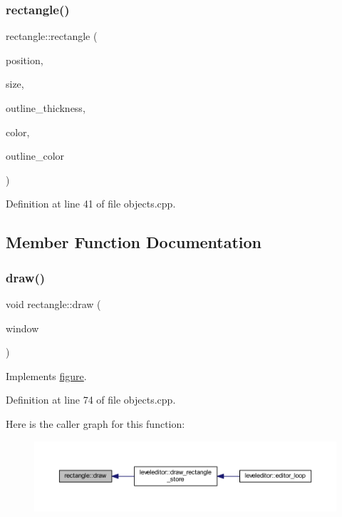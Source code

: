 \subsubsection{\texorpdfstring{rectangle()}{rectangle()}}
{\footnotesize\ttfamily rectangle\+::rectangle (\begin{DoxyParamCaption}\item[{sf\+::\+Vector2f}]{position,  }\item[{sf\+::\+Vector2f}]{size,  }\item[{float}]{outline\+\_\+thickness,  }\item[{sf\+::\+Color}]{color,  }\item[{sf\+::\+Color}]{outline\+\_\+color }\end{DoxyParamCaption})}



Definition at line 41 of file objects.\+cpp.



\subsection{Member Function Documentation}
\mbox{\label{classrectangle_aac9bb03014c071fdf932f6cfa3f34f55}} 
\subsubsection{\texorpdfstring{draw()}{draw()}}
{\footnotesize\ttfamily void rectangle\+::draw (\begin{DoxyParamCaption}\item[{sf\+::\+Render\+Window \&}]{window }\end{DoxyParamCaption})\hspace{0.3cm}{\ttfamily [virtual]}}



Implements \hyperlink{classfigure_a56d8a53a8bf2b82178aa476bac071596}{figure}.



Definition at line 74 of file objects.\+cpp.

Here is the caller graph for this function\+:
\nopagebreak
\begin{figure}[H]
\begin{center}
\leavevmode
\includegraphics[width=350pt]{classrectangle_aac9bb03014c071fdf932f6cfa3f34f55_icgraph}
\end{center}
\end{figure}
\mbox{\label{classrectangle_a827e05afcb275c3e6fe29fc80337d8cc}} 
